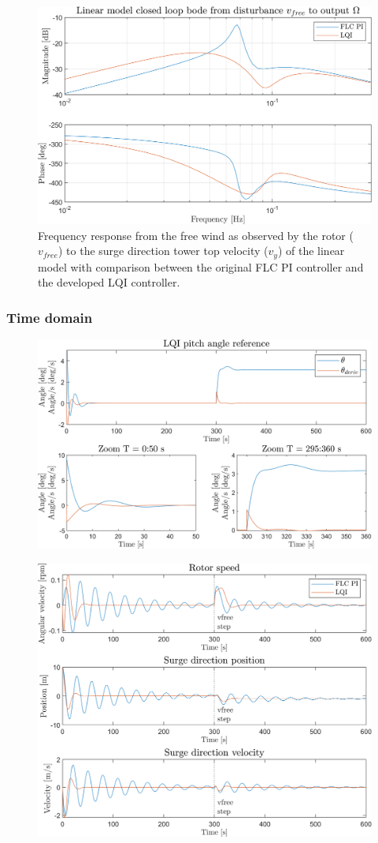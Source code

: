 \begin{figure}[ht]
	\centering
	\includegraphics[width=0.7\linewidth]{Graphics/TestResults/linearModPerf/11_vfreeToW.png}
	\caption{Frequency response from the free wind as observed by the rotor ($ v_{free} $) to the surge direction tower top velocity ($ v_y $) of the linear model with comparison between the original FLC PI controller and the developed LQI controller.}
	\label{fig:11_vfreeToW}
\end{figure}


\subsubsection{Time domain}

\begin{figure}[ht]
	\centering
	\includegraphics[width=0.7\linewidth]{Graphics/TestResults/linearModPerf/01_pitch.png}
	\caption{}
	\label{fig:01_pitch}
\end{figure}

\begin{figure}[ht]
	\centering
	\includegraphics[width=0.7\linewidth]{Graphics/TestResults/linearModPerf/02_W_py_vy_comp.png}
	\caption{}
	\label{fig:02_W_py_vy_comp}
\end{figure}

